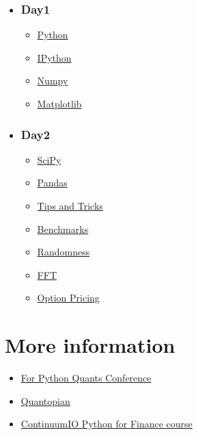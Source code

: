     \begin{itemize}
\item
  \subsection{Day1}\label{day1}

  \begin{itemize}
  \itemsep1pt\parskip0pt
  \item
    \href{I-Python.ipynb}{Python}
  \item
    \href{II-IPython.ipynb}{IPython}
  \item
    \href{III-Numpy.ipynb}{Numpy}
  \item
    \href{V-Matplotlib.ipynb}{Matplotlib}
  \end{itemize}
\item
  \subsection{Day2}\label{day2}

  \begin{itemize}
  \itemsep1pt\parskip0pt
  \item
    \href{IV-SciPy.ipynb}{SciPy}
  \item
    \href{VI-Pandas.ipynb}{Pandas}
  \item
    \href{VII-Tips-and-Tricks.ipynb}{Tips and Tricks}
  \item
    \href{VIII-Benchmarks.ipynb}{Benchmarks}
  \item
    \href{IX-Randomness.ipynb}{Randomness}
  \item
    \href{X-FFT.ipynb}{FFT}
  \item
    \href{XI-OptionPricing.ipynb}{Option Pricing}
  \end{itemize}
\end{itemize}


    \chapter{More information}


    \begin{itemize}
\itemsep1pt\parskip0pt
\item
  \href{http://forpythonquants.com/}{For Python Quants Conference}
\item
  \href{http://www.quantopian.com}{Quantopian}
\item
  \href{https://store.continuum.io/cshop/python-for-finance/}{ContinuumIO
  Python for Finance course}
\end{itemize}

